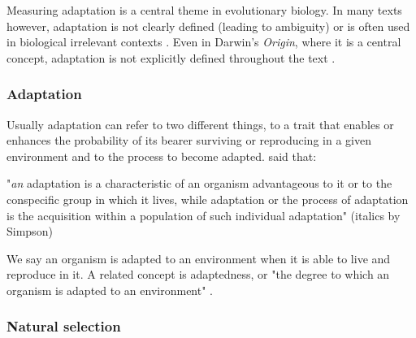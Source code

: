 Measuring adaptation is a central theme in evolutionary biology. In many texts however, adaptation is not clearly defined (leading to ambiguity) or is often used in biological irrelevant contexts \citep{Dobzhansky1968}.  
Even in Darwin's \textit{Origin}, where it is a central concept, adaptation is not explicitly defined throughout the text \citep{darwin1859origin}.

\subsubsection{Adaptation}

Usually adaptation can refer to two different things, to a trait that enables or enhances the probability of its bearer surviving or reproducing in a given environment \citep{Dobzhansky1956} and to the process to become adapted.
\citet{Simpson1953} said that: 

"\textit{an} adaptation is a characteristic of an organism advantageous to it or to the conspecific group in which it lives, while adaptation or the process of adaptation is the acquisition within a population of such individual adaptation" (italics by Simpson)

We say an organism is adapted to an environment when it is able to live and reproduce in it. A related concept is adaptedness, or "the degree to which an organism is adapted to an environment" \citep{Dobzhansky1968}.
%
%


\subsubsection{Natural selection}

